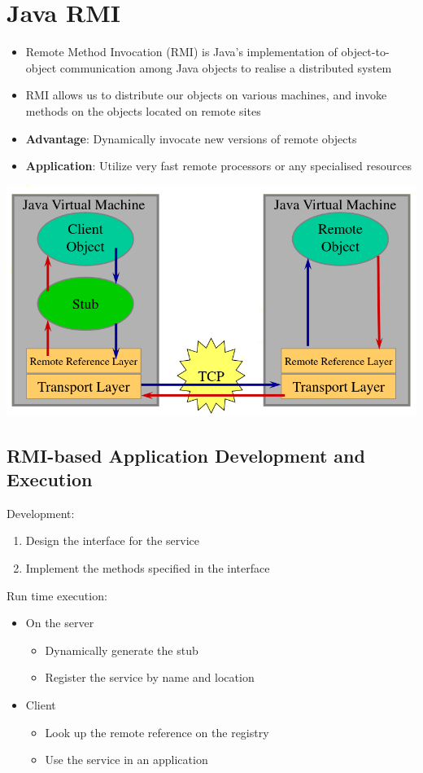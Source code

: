 \documentclass{article}[18pt]
\begin{document}
\section{Java RMI}
\begin{itemize}
	\item Remote Method Invocation (RMI) is Java's implementation of object-to-object communication among Java objects to realise a distributed system
	\item RMI allows us to distribute our objects on various machines, and invoke methods on the objects located on remote sites
	\item \textbf{Advantage}: Dynamically invocate new versions of remote objects
	\item \textbf{Application}: Utilize very fast remote processors or any specialised resources
\end{itemize}
\begin{center}
	\includegraphics[scale=0.7]{RMI}
\end{center}
\subsection{RMI-based Application Development and Execution}
Development:
\begin{enumerate}
	\item Design the interface for the service
	\item Implement the methods specified in the interface
\end{enumerate}
Run time execution:
\begin{itemize}
	\item On the server
	\begin{itemize}
		\item Dynamically generate the stub
		\item Register the service by name and location
	\end{itemize}
	\item Client
	\begin{itemize}
		\item Look up the remote reference on the registry
		\item Use the service in an application
	\end{itemize}
\end{itemize}
\end{document}
